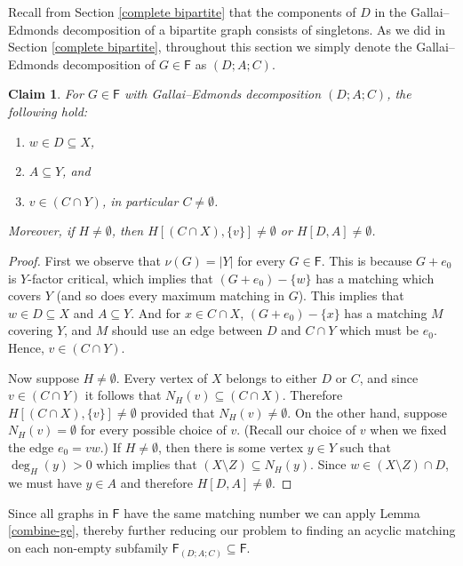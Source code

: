 \documentclass[10pt]{amsart}
\newtheorem{claim}[thm]{Claim}
\theoremstyle{definition}
\begin{document}
	\medskip
	
	Recall from Section \ref{complete bipartite} that the components of $D$ in the Gallai--Edmonds decomposition of a bipartite graph consists of singletons. As we did in Section \ref{complete bipartite}, throughout this section we simply denote the Gallai--Edmonds decomposition of 
	$G\in \mathsf{F}$ as $(D;A;C)$. 
	
	\begin{claim} \label{bipartite ge conditions}
		For $G\in \mathsf{F}$ with Gallai--Edmonds decomposition $(D; A; C)$, the following hold:
		\begin{enumerate}
			\item $w\in D \subseteq X$,
			\item $A\subseteq Y$, and
			\item $v\in (C\cap Y)$, in particular $C\neq \emptyset$.
		\end{enumerate}
		Moreover, if $H\neq \emptyset$, then $H[(C\cap X), \{v\}]\neq \emptyset$ or $H[D,A]\neq \emptyset$.
	\end{claim}
	\begin{proof}
		First we observe that $\nu(G) = |Y|$ for every $G\in \mathsf{F}$. This is because $G+e_0$ is $Y$-factor critical, which implies that $(G+e_0)-\{w\}$ has a matching which covers $Y$ (and so does every maximum matching in $G$). This implies that $w\in D \subseteq X$ and $A\subseteq Y$. And for $x\in C\cap X$, $(G+e_0)-\{x\}$ has a matching $M$ covering $Y$, and $M$ should use an edge between $D$ and $C\cap Y$ which must be $e_0$. Hence, $v\in (C\cap Y)$. 
		
		Now suppose $H\neq\emptyset$. Every vertex of $X$ belongs to either $D$ or $C$, and since $v\in (C\cap Y)$ it follows that $N_H(v)\subseteq (C\cap X)$. Therefore $H[(C\cap X), \{v\}]\neq\emptyset$ 
		provided that $N_H(v)\neq\emptyset$. On the other hand, suppose $N_H(v)= \emptyset$ for every possible choice of $v$. (Recall our choice of $v$ when we fixed the edge $e_0 = vw$.) If $H\neq \emptyset$, then there is some vertex $y\in Y$ such that $\deg_H(y)>0$ which implies that $(X\setminus Z)\subseteq N_H(y)$. Since $w\in (X\setminus Z) \cap D$, we must have $y\in A$ and therefore $H[D,A]\neq \emptyset$.
	\end{proof}
	
	
	Since all graphs in $\mathsf{F}$ have the same matching number we can apply Lemma \ref{combine-ge}, thereby further reducing our problem  to finding an acyclic matching on each non-empty subfamily $\mathsf{F}_{(D;A;C)} \subseteq \mathsf{F}$. 
	
\end{document}
